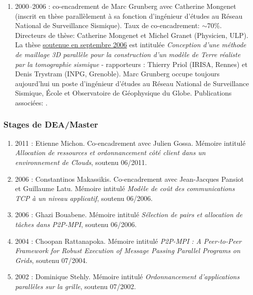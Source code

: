 \documentclass[11pt]{article}
\begin{document}
\begin{enumerate}
\item 2000--2006 : co-encadrement de Marc Grunberg avec Catherine Mongenet 
(inscrit en thèse parallèlement à sa fonction d'ingénieur d'études au Réseau 
National de Surveillance Sismique). Taux de co-encadrement: $\sim$70\%.
Directeurs de thèse: Catherine Mongenet et Michel Granet (Physicien, ULP).
La thèse \underline{soutenue en septembre 2006} est intitulée \textit{Conception 
d'une méthode de maillage 3D parallèle pour la construction d'un modèle de Terre 
réaliste par la tomographie sismique} - rapporteurs : Thierry Priol (IRISA, Rennes) 
et Denis Trystram (INPG, Grenoble).
Marc Grunberg occupe toujours aujourd'hui un poste d'ingénieur d'études au Réseau 
National de Surveillance Sismique, \'{E}cole et Observatoire de Géophysique du Globe.
Publications associées: 
\cite{icps-2002-20,icps-2003-111,icps-2003-113,
      icps-2004-107,icps-2004-124,icps-2005-146,icps-2007-184}.\\



\end{enumerate}

\subsubsection{Stages de DEA/Master}
\begin{enumerate}

\item 2011 : Etienne Michon. Co-encadrement avec Julien Gossa. Mémoire 
intitulé  \textit{Allocation de ressources et ordonnancement côté client dans 
un environnement de Clouds}, soutenu 06/2011.
\item 2006 : Constantinos Makassikis. Co-encadrement avec Jean-Jacques Pansiot 
et Guillaume Latu. Mémoire intitulé \textit{Modèle de coût des communications 
TCP à un niveau applicatif}, soutenu 06/2006.
\item 2006 : Ghazi Bouabene. Mémoire intitulé  \textit{Sélection de pairs et 
allocation de tâches dans P2P-MPI}, soutenu 06/2006.
\item 2004 : Choopan Rattanapoka. Mémoire intitulé  \textit{P2P-MPI : A 
Peer-to-Peer Framework for Robust Execution of Message Passing Parallel 
Programs on Grids}, soutenu 07/2004.
\item 2002 : Dominique Stehly. Mémoire intitulé \textit{Ordonnancement 
d'applications parallèles sur la grille}, soutenu 07/2002.
\end{enumerate}
\end{document}
